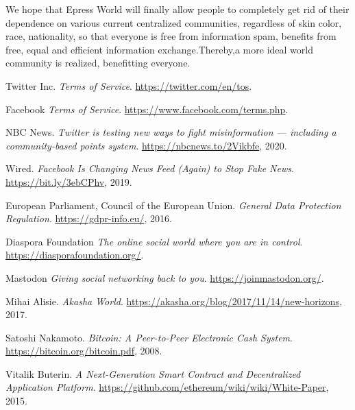\documentclass{article}
\begin{document}
    We hope that Epress World will finally allow people to completely get rid of their dependence on various current centralized communities, regardless of skin color, race, nationality, so that everyone is free from information spam, benefits from free, equal and efficient information exchange.Thereby,a more ideal world community is realized, benefitting everyone.
\begin{thebibliography}{9}

Twitter Inc.
\textit{Terms of Service}.
\url{https://twitter.com/en/tos}.

Facebook
\textit{Terms of Service}.
\url{https://www.facebook.com/terms.php}.

NBC News.
\textit{Twitter is testing new ways to fight misinformation — including a community-based points system}.
\url{https://nbcnews.to/2Vikbfe}, 2020.

Wired.
\textit{Facebook Is Changing News Feed (Again) to Stop Fake News}.
\url{https://bit.ly/3ebCPhv}, 2019.

European Parliament, Council of the European Union.
\textit{General Data Protection Regulation}.
\url{https://gdpr-info.eu/}, 2016.

Diaspora Foundation
\textit{The online social world where you are in control}.
\url{https://diasporafoundation.org/}.

Mastodon
\textit{Giving social networking back to you}.
\url{https://joinmastodon.org/}.

Mihai Alisie.
\textit{Akasha World}.
\url{https://akasha.org/blog/2017/11/14/new-horizons}, 2017.

Satoshi Nakamoto.
\textit{Bitcoin: A Peer-to-Peer Electronic Cash System}. 
\url{https://bitcoin.org/bitcoin.pdf}, 2008.

Vitalik Buterin.
\textit{A Next-Generation Smart Contract and Decentralized Application Platform}.
\url{https://github.com/ethereum/wiki/wiki/White-Paper}, 2015.

\end{thebibliography}
\end{document}
